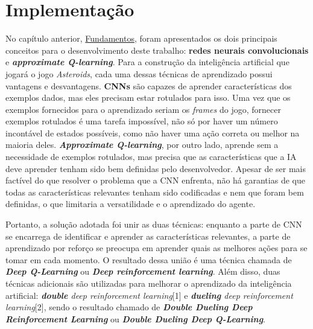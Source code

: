 

\chapter{Implementação}
\label{cap:implementacao}

No capítulo anterior, \hyperref[cap:fundamentos]{Fundamentos}, foram apresentados os dois principais conceitos para o desenvolvimento deste trabalho: \textbf{redes neurais convolucionais} e \textbf{\textit{approximate Q-learning}}.
Para a construção da inteligência artificial que jogará o jogo \textit{Asteroids}, cada uma dessas técnicas de aprendizado possui vantagens e desvantagens.
\textbf{CNNs} são capazes de aprender características dos exemplos dados, mas eles precisam estar rotulados para isso.
Uma vez que os exemplos fornecidos para o aprendizado seriam os \textit{frames} do jogo, fornecer exemplos rotulados é uma tarefa impossível, não só por haver um número incontável de estados possíveis, como não haver uma ação correta ou melhor na maioria deles.
\textbf{\textit{Approximate Q-learning}}, por outro lado, aprende sem a necessidade de exemplos rotulados, mas precisa que as características que a IA deve aprender tenham sido bem definidas pelo desenvolvedor.
Apesar de ser mais factível do que resolver o problema que a CNN enfrenta, não há garantias de que todas as características relevantes tenham sido codificadas e nem que foram bem definidas, o que limitaria a versatilidade e o aprendizado do agente.

Portanto, a solução adotada foi unir as duas técnicas: enquanto a parte de CNN se encarrega de identificar e aprender as características relevantes, a parte de aprendizado por reforço se preocupa em aprender quais as melhores ações para se tomar em cada momento.
O resultado dessa união é uma técnica chamada de \textbf{\textit{Deep Q-Learning}} ou \textbf{\textit{Deep reinforcement learning}}.
Além disso, duas técnicas adicionais são utilizadas para melhorar o aprendizado da inteligência artificial: \textit{\textbf{double} deep reinforcement learning}[1] e \textit{\textbf{dueling} deep reinforcement learning}[2], sendo o resultado chamado de \textit{\textbf{Double Dueling Deep Reinforcement Learning}} ou \textit{\textbf{Double Dueling Deep Q-Learning}}.

